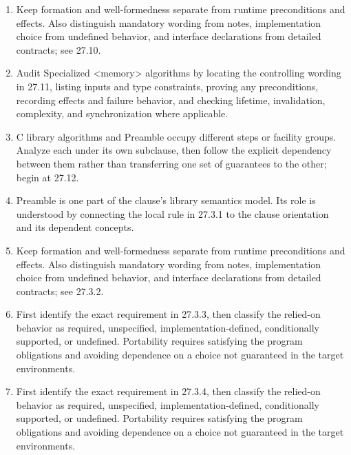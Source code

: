\documentclass[11pt,letterpaper]{article}
\begin{document}
\begin{enumerate}
\item Keep formation and well-formedness separate from runtime preconditions and effects. Also distinguish mandatory wording from notes, implementation choice from undefined behavior, and interface declarations from detailed contracts; see 27.10.
\item Audit Specialized <memory> algorithms by locating the controlling wording in 27.11, listing inputs and type constraints, proving any preconditions, recording effects and failure behavior, and checking lifetime, invalidation, complexity, and synchronization where applicable.
\item C library algorithms and Preamble occupy different steps or facility groups. Analyze each under its own subclause, then follow the explicit dependency between them rather than transferring one set of guarantees to the other; begin at 27.12.
\item Preamble is one part of the clause's library semantics model. Its role is understood by connecting the local rule in 27.3.1 to the clause orientation and its dependent concepts.
\item Keep formation and well-formedness separate from runtime preconditions and effects. Also distinguish mandatory wording from notes, implementation choice from undefined behavior, and interface declarations from detailed contracts; see 27.3.2.
\item First identify the exact requirement in 27.3.3, then classify the relied-on behavior as required, unspecified, implementation-defined, conditionally supported, or undefined. Portability requires satisfying the program obligations and avoiding dependence on a choice not guaranteed in the target environments.
\item First identify the exact requirement in 27.3.4, then classify the relied-on behavior as required, unspecified, implementation-defined, conditionally supported, or undefined. Portability requires satisfying the program obligations and avoiding dependence on a choice not guaranteed in the target environments.
\end{enumerate}
\end{document}
